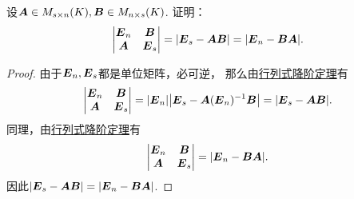 \begin{example}\label{example:逆矩阵.行列式降阶定理的重要应用1}
设\(\boldsymbol{A} \in M_{s \times n}(K),
\boldsymbol{B} \in M_{n \times s}(K)\).
证明：\begin{equation*}
	\begin{vmatrix}
		\boldsymbol{E}_n & \boldsymbol{B} \\
		\boldsymbol{A} & \boldsymbol{E}_s
	\end{vmatrix}
	= \abs{\boldsymbol{E}_s - \boldsymbol{A} \boldsymbol{B}}
	= \abs{\boldsymbol{E}_n - \boldsymbol{B} \boldsymbol{A}}.
\end{equation*}
\begin{proof}
由于\(\boldsymbol{E}_n,\boldsymbol{E}_s\)都是单位矩阵，必可逆，
那么由\hyperref[equation:逆矩阵.行列式降阶公式1]{行列式降阶定理}有\begin{equation*}
	\begin{vmatrix}
		\boldsymbol{E}_n & \boldsymbol{B} \\
		\boldsymbol{A} & \boldsymbol{E}_s
	\end{vmatrix}
	= \abs{\boldsymbol{E}_n} \abs{\boldsymbol{E}_s - \boldsymbol{A}(\boldsymbol{E}_n)^{-1}\boldsymbol{B}}
	= \abs{\boldsymbol{E}_s - \boldsymbol{A} \boldsymbol{B}}.
\end{equation*}
同理，由\hyperref[equation:逆矩阵.行列式降阶公式2]{行列式降阶定理}有\begin{equation*}
	\begin{vmatrix}
		\boldsymbol{E}_n & \boldsymbol{B} \\
		\boldsymbol{A} & \boldsymbol{E}_s
	\end{vmatrix}
	= \abs{\boldsymbol{E}_n - \boldsymbol{B} \boldsymbol{A}}.
\end{equation*}
因此\(\abs{\boldsymbol{E}_s - \boldsymbol{A} \boldsymbol{B}} = \abs{\boldsymbol{E}_n - \boldsymbol{B} \boldsymbol{A}}\).
\end{proof}
\end{example}

